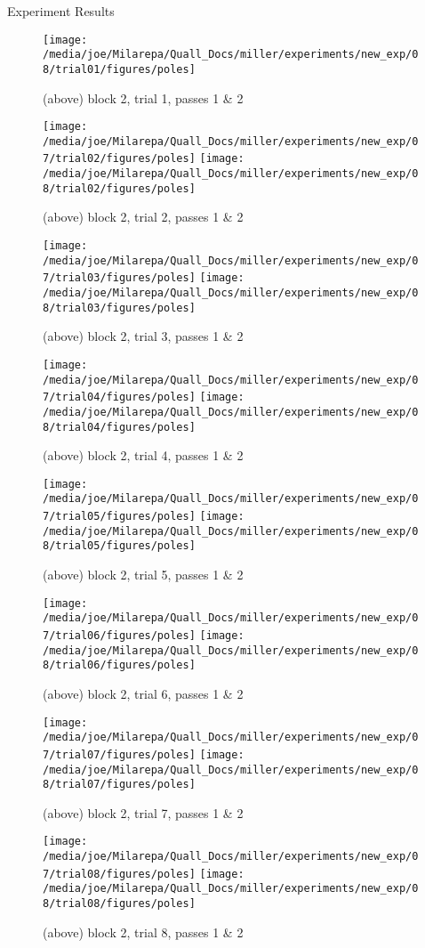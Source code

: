 \documentclass[a4paper,10pt]{report}
\numberwithin{equation}{section}
\begin{document}
{\begin{chapter}
\begin{section}{Experiment Results}
\begin{singlespace}
\begin{figure}[h]
\texttt{[image: /media/joe/Milarepa/Quall\_Docs/miller/experiments/new\_exp/08/trial01/figures/poles]}
\caption{(above) block 2, trial 1, passes 1 \& 2}
\end{figure}
\begin{figure}[h]
\texttt{[image: /media/joe/Milarepa/Quall\_Docs/miller/experiments/new\_exp/07/trial02/figures/poles]}
\texttt{[image: /media/joe/Milarepa/Quall\_Docs/miller/experiments/new\_exp/08/trial02/figures/poles]}
\caption{(above) block 2, trial 2, passes 1 \& 2}
\end{figure}
\begin{figure}[h]
\texttt{[image: /media/joe/Milarepa/Quall\_Docs/miller/experiments/new\_exp/07/trial03/figures/poles]}
\texttt{[image: /media/joe/Milarepa/Quall\_Docs/miller/experiments/new\_exp/08/trial03/figures/poles]}
\caption{(above) block 2, trial 3, passes 1 \& 2}
\texttt{[image: /media/joe/Milarepa/Quall\_Docs/miller/experiments/new\_exp/07/trial04/figures/poles]}
\texttt{[image: /media/joe/Milarepa/Quall\_Docs/miller/experiments/new\_exp/08/trial04/figures/poles]}
\caption{(above) block 2, trial 4, passes 1 \& 2}
\end{figure}
\begin{figure}[h]
\texttt{[image: /media/joe/Milarepa/Quall\_Docs/miller/experiments/new\_exp/07/trial05/figures/poles]}
\texttt{[image: /media/joe/Milarepa/Quall\_Docs/miller/experiments/new\_exp/08/trial05/figures/poles]}
\caption{(above) block 2, trial 5, passes 1 \& 2}
\texttt{[image: /media/joe/Milarepa/Quall\_Docs/miller/experiments/new\_exp/07/trial06/figures/poles]}
\texttt{[image: /media/joe/Milarepa/Quall\_Docs/miller/experiments/new\_exp/08/trial06/figures/poles]}
\caption{(above) block 2, trial 6, passes 1 \& 2}
\end{figure}
\begin{figure}[h]
\texttt{[image: /media/joe/Milarepa/Quall\_Docs/miller/experiments/new\_exp/07/trial07/figures/poles]}
\texttt{[image: /media/joe/Milarepa/Quall\_Docs/miller/experiments/new\_exp/08/trial07/figures/poles]}
\caption{(above) block 2, trial 7, passes 1 \& 2}
\texttt{[image: /media/joe/Milarepa/Quall\_Docs/miller/experiments/new\_exp/07/trial08/figures/poles]}
\texttt{[image: /media/joe/Milarepa/Quall\_Docs/miller/experiments/new\_exp/08/trial08/figures/poles]}
\caption{(above) block 2, trial 8, passes 1 \& 2}
\end{figure}
\begin{figure}[h]

\end{figure}
\end{singlespace}
\end{section}
\end{chapter}}
\end{document}
